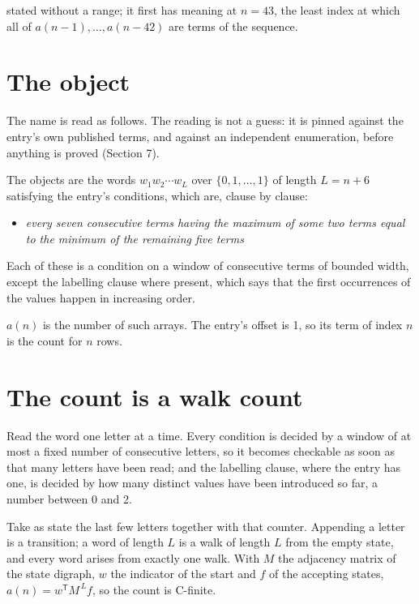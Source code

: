 \documentclass[11pt]{article}
\theoremstyle{definition}
\begin{document}
stated without a range; it first has meaning at $n = 43$, the least index at which all of $a(n-1),\dots,a(n-42)$ are terms of the sequence.

\section{The object}

The name is read as follows. The reading is not a guess: it is pinned against the entry's own published terms, and against an independent enumeration, before anything is proved (Section 7).

The objects are the words $w_1 w_2 \cdots w_L$ over $\{0,1,\dots,1\}$ of length $L = n + 6$ satisfying the entry's conditions, which are, clause by clause:

\begin{itemize}

\item {\itshape every seven consecutive terms having the maximum of some two terms equal to the minimum of the remaining five terms}

\end{itemize}

Each of these is a condition on a window of consecutive terms of bounded width, except the labelling clause where present, which says that the first occurrences of the values happen in increasing order.

$a(n)$ is the number of such arrays. The entry's offset is 1, so its term of index $n$ is the count for $n$ rows.

\section{The count is a walk count}

Read the word one letter at a time. Every condition is decided by a window of at most a fixed number of consecutive letters, so it becomes checkable as soon as that many letters have been read; and the labelling clause, where the entry has one, is decided by how many distinct values have been introduced so far, a number between $0$ and 2.

Take as state the last few letters together with that counter. Appending a letter is a transition; a word of length $L$ is a walk of length $L$ from the empty state, and every word arises from exactly one walk. With $M$ the adjacency matrix of the state digraph, $w$ the indicator of the start and $f$ of the accepting states, $a(n) = w^{\mathsf T}M^{\,L}f$, so the count is C-finite.
\end{document}
